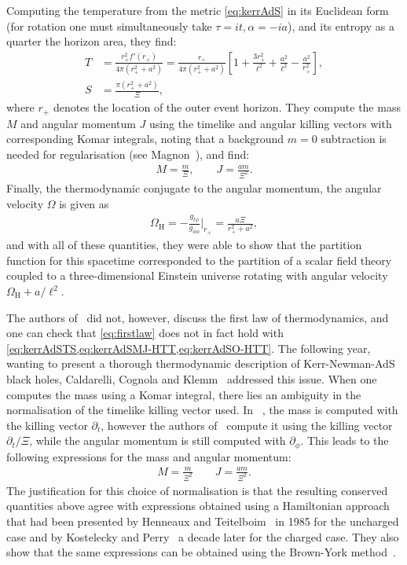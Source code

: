 \documentclass[
twoside,
openright,
frontopenright,
]{dmathesis}
\newcommand{\nn}{\nonumber}
\begin{document}
Computing the temperature from the metric \cref{eq:kerrAdS} in its Euclidean
form (for rotation one must simultaneously take $\tau=it, \alpha=-ia$), and its
entropy as a quarter the horizon area, they find:
\begin{align}
  \label{eq:kerrAdSTS}
  T&=\frac{r_+^2f'(r_+)}{4\pi(r_+^2+a^2)} = \frac{r_+}{4\pi(r_+^2+a^2)} \left[1 +
  \frac{3r_+^2}{\ell^2} + \frac{a^2}{\ell^2} - \frac{a^2}{r_+^2}\right],\nn\\
  S&=\frac{\pi(r_+^2+a^2)}{\Xi},
\end{align}
where $r_+$ denotes the location of the outer event horizon. They compute the
mass $M$ and angular momentum $J$ using the timelike and angular killing vectors
with corresponding Komar integrals, noting that a background $m=0$ subtraction
is needed for regularisation (see Magnon~\cite{Magnon:1985sc}), and find:
\begin{align}
  \label{eq:kerrAdSMJ-HTT}
  M=\frac{m}{\Xi}, \qquad J=\frac{am}{\Xi^2}.
\end{align}
Finally, the thermodynamic conjugate to the angular momentum, the angular
velocity $\Omega$ is given as
\begin{align}
  \label{eq:kerrAdSO-HTT}
  \Omega_\mathrm{H} = -\frac{g_{t\phi}}{g_{\phi\phi}}\Big|_{r_+} = \frac{a\Xi}{r_+^2+a^2},
\end{align}
and with all of these quantities, they were able to show that the partition
function for this spacetime corresponded to the partition of a scalar field
theory coupled to a three-dimensional Einstein universe rotating with angular
velocity $\Omega_\mathrm{H} + a/\ell^2$.

The authors of~\cite{Hawking:1998kw} did not, however, discuss the first law of
thermodynamics, and one can check that \cref{eq:firstlaw} does not in fact hold
with \cref{eq:kerrAdSTS,eq:kerrAdSMJ-HTT,eq:kerrAdSO-HTT}. The following year,
wanting to present a thorough thermodynamic description of Kerr-Newman-AdS black
holes, Caldarelli, Cognola and Klemm~\cite{Caldarelli:1999xj} addressed this
issue. When one computes the mass using a Komar integral, there lies an
ambiguity in the normalisation of the timelike killing vector used. In
~\cite{Hawking:1998kw}, the mass is computed with the killing vector
$\partial_t$, however the authors of~\cite{Caldarelli:1999xj} compute it using
the killing vector $\partial_t/\Xi$, while the angular momentum is still
computed with $\partial_\phi$. This leads to the following expressions for
the mass and angular momentum:
\begin{align}
  \label{eq:kerrAdSMJ-CCK}
  M=\frac{m}{\Xi^2} \qquad J=\frac{am}{\Xi^2}.
\end{align}
The justification for this choice of normalisation is that the resulting
conserved quantities above agree with expressions obtained using a Hamiltonian
approach that had been presented by Henneaux and
Teitelboim~\cite{Henneaux:1985tv} in 1985 for the uncharged case and by
Kostelecky and Perry~\cite{Kostelecky:1995ei} a decade later for the charged
case. They also show that the same expressions can be obtained using the
Brown-York method~\cite{Brown:1992br}.
\end{document}
